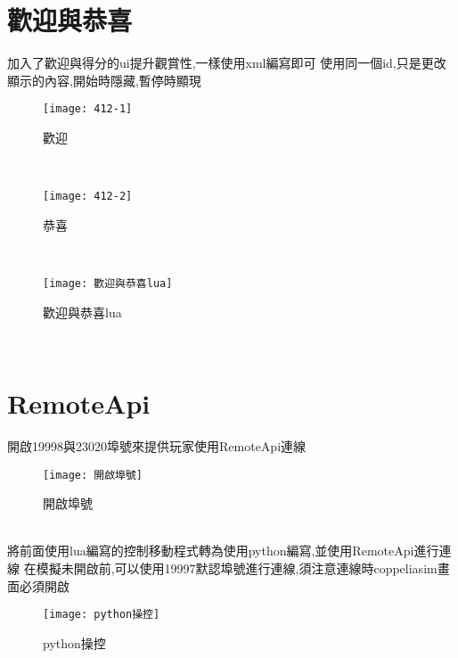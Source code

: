 \section{歡迎與恭喜}
加入了歡迎與得分的ui提升觀賞性,一樣使用xml編寫即可
使用同一個id,只是更改顯示的內容,開始時隱藏,暫停時顯現
\begin{figure}[hbt!]
\begin{center}
\texttt{[image: 412-1]}
\caption{\Large 歡迎 }\label{歡迎}
\end{center}
\end{figure} 
\qquad \\
\begin{figure}[hbt!]
\begin{center}
\texttt{[image: 412-2]}
\caption{\Large 恭喜 }\label{恭喜}
\end{center}
\end{figure} 
\qquad \\
\begin{figure}[hbt!]
\begin{center}
\texttt{[image: 歡迎與恭喜lua]}
\caption{\Large 歡迎與恭喜lua }\label{歡迎與恭喜lua}
\end{center}
\end{figure} 
\\
\section{RemoteApi}
開啟19998與23020埠號來提供玩家使用RemoteApi連線
\begin{figure}[hbt!]
\begin{center}
\texttt{[image: 開啟埠號]}
\caption{\Large 開啟埠號 }\label{開啟埠號}
\end{center}
\end{figure} 
\qquad \\
將前面使用lua編寫的控制移動程式轉為使用python編寫,並使用RemoteApi進行連線
在模擬未開啟前,可以使用19997默認埠號進行連線,須注意連線時coppeliasim畫面必須開啟\\
\begin{figure}[hbt!]
\begin{center}
\texttt{[image: python操控]}
\caption{\Large python操控 }\label{python操控}
\end{center}
\end{figure} 
\newpage